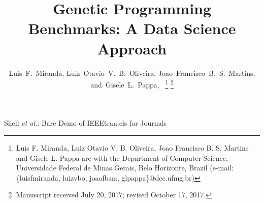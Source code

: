 \documentclass[journal]{IEEEtran}
\begin{document}
\setul{0.5ex}{0.3ex}

\title{Genetic Programming Benchmarks: A Data Science Approach}
%
%
%

\author{Luis~F.~Miranda,
        Luiz~Otavio~V.~B.~Oliveira,
        Joao~Francisco~B.~S.~Martins,
        and~Gisele~L.~Pappa,~%
\thanks{Luis F. Miranda, Luiz Otavio V. B. Oliveira, Joao Francisco B. S. Martins and Gisele L. Pappa are with the Department of Computer Science, Universidade Federal de Minas Gerais, Belo Horizonte, Brazil (e-mail: \{luisfmiranda, luizvbo, joaofbsm, glpappa\}@dcc.ufmg.br)}%
\thanks{Manuscript received July 20, 2017; revised October 17, 2017.}}

% 
%



%
{Shell \MakeLowercase{\textit{et al.}}: Bare Demo of IEEEtran.cls for Journals}
% 
\end{document}
